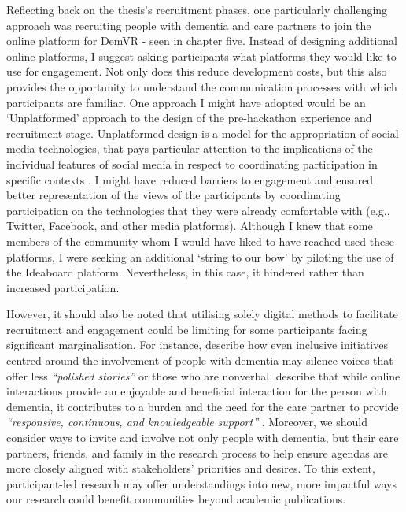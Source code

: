 Reflecting back on the thesis's recruitment phases, one particularly challenging approach was recruiting people with dementia and care partners to join the online platform for DemVR - seen in chapter five. Instead of designing additional online platforms, I suggest asking participants what platforms they would like to use for engagement. Not only does this reduce development costs, but this also provides the opportunity to understand the communication processes with which participants are familiar. One approach I might have adopted would be an ‘Unplatformed’ approach to the design of the pre-hackathon experience and recruitment stage. Unplatformed design is a model for the appropriation of social media technologies, that pays particular attention to the implications of the individual features of social media in respect to coordinating participation in specific contexts \citep{lambton-howard_unplatformed_2020}. I might have reduced barriers to engagement and ensured better representation of the views of the participants by coordinating participation on the technologies that they were already comfortable with (e.g., Twitter, Facebook, and other media platforms). Although I knew that some members of the community whom I would have liked to have reached used these platforms, I were seeking an additional ‘string to our bow’ by piloting the use of the Ideaboard platform. Nevertheless, in this case, it hindered rather than increased participation. 

However, it should also be noted that utilising solely digital methods to facilitate recruitment and engagement could be limiting for some participants facing significant marginalisation. For instance, \cite{lazar_safe_2019} describe how even inclusive initiatives centred around the involvement of people with dementia may silence voices that offer less \textit{``polished stories''} or those who are nonverbal. \cite{dai2020making} describe that while online interactions provide an enjoyable and beneficial interaction for the person with dementia, it contributes to a burden and the need for the care partner to provide \textit{``responsive, continuous, and knowledgeable support'' }\citep[pg. 46:24]{hwang2020exploring}. Moreover, we should consider ways to invite and involve not only people with dementia, but their care partners, friends, and family in the research process to help ensure agendas are more closely aligned with stakeholders’ priorities and desires. To this extent, participant-led research may offer understandings into new, more impactful ways our research could benefit communities beyond academic publications.

